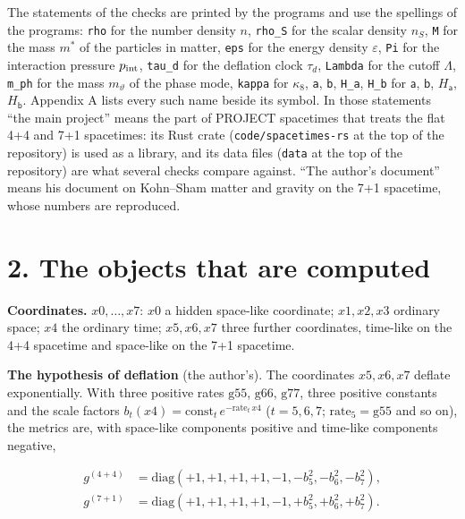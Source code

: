 \documentclass[
  10pt,
]{article}
\begin{document}
The statements of the checks are printed by the programs and use the
spellings of the programs: \texttt{rho} for the number density \(n\),
\texttt{rho\_S} for the scalar density \(n_S\), \texttt{M} for the mass
\(m^*\) of the particles in matter, \texttt{eps} for the energy density
\(\varepsilon\), \texttt{Pi} for the interaction pressure
\(p_{\rm int}\), \texttt{tau\_d} for the deflation clock \(\tau_d\),
\texttt{Lambda} for the cutoff \(\Lambda\), \texttt{m\_ph} for the mass
\(m_\vartheta\) of the phase mode, \texttt{kappa} for \(\kappa_8\),
\texttt{a}, \texttt{b}, \texttt{H\_a}, \texttt{H\_b} for \(\mathsf a\),
\(\mathsf b\), \(H_{\mathsf a}\), \(H_{\mathsf b}\). Appendix A lists
every such name beside its symbol. In those statements ``the main
project'' means the part of PROJECT spacetimes that treats the flat 4+4
and 7+1 spacetimes: its Rust crate (\texttt{code/spacetimes-rs} at the
top of the repository) is used as a library, and its data files
(\texttt{data} at the top of the repository) are what several checks
compare against. ``The author's document'' means his document on
Kohn--Sham matter and gravity on the 7+1 spacetime, whose numbers are
reproduced.

\hypertarget{the-objects-that-are-computed}{%
\section{2. The objects that are
computed}\label{the-objects-that-are-computed}}

\textbf{Coordinates.} \(x0,\dots,x7\): \(x0\) a hidden space-like
coordinate; \(x1,x2,x3\) ordinary space; \(x4\) the ordinary time;
\(x5,x6,x7\) three further coordinates, time-like on the 4+4 spacetime
and space-like on the 7+1 spacetime.

\textbf{The hypothesis of deflation} (the author's). The coordinates
\(x5,x6,x7\) deflate exponentially. With three positive rates
\(\mathrm{g55}\), \(\mathrm{g66}\), \(\mathrm{g77}\), three positive
constants and the scale factors
\(b_t(x4)=\mathrm{const}_t\,e^{-\mathrm{rate}_t\,x4}\) (\(t=5,6,7\);
\(\mathrm{rate}_5=\mathrm{g55}\) and so on), the metrics are, with
space-like components positive and time-like components negative,

\[\begin{aligned}
g^{(4+4)}&=\mathrm{diag}(+1,+1,+1,+1,-1,-b_5^2,-b_6^2,-b_7^2),\\
g^{(7+1)}&=\mathrm{diag}(+1,+1,+1,+1,-1,+b_5^2,+b_6^2,+b_7^2).
\end{aligned}\]
\end{document}
